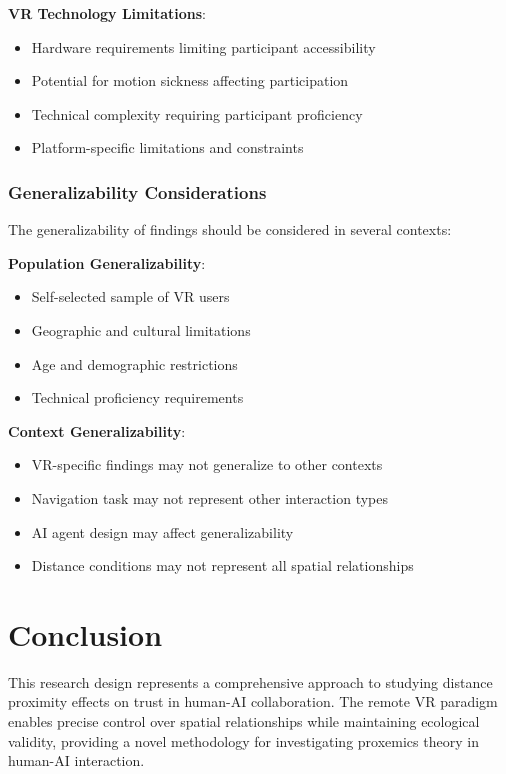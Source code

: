 \documentclass[12pt]{article}
\begin{document}
\textbf{VR Technology Limitations}:
\begin{itemize}
    \item Hardware requirements limiting participant accessibility
    \item Potential for motion sickness affecting participation
    \item Technical complexity requiring participant proficiency
    \item Platform-specific limitations and constraints
\end{itemize}

\subsubsection{Generalizability Considerations}

The generalizability of findings should be considered in several contexts:

\textbf{Population Generalizability}:
\begin{itemize}
    \item Self-selected sample of VR users
    \item Geographic and cultural limitations
    \item Age and demographic restrictions
    \item Technical proficiency requirements
\end{itemize}

\textbf{Context Generalizability}:
\begin{itemize}
    \item VR-specific findings may not generalize to other contexts
    \item Navigation task may not represent other interaction types
    \item AI agent design may affect generalizability
    \item Distance conditions may not represent all spatial relationships
\end{itemize}

\section{Conclusion}

This research design represents a comprehensive approach to studying distance proximity effects on trust in human-AI collaboration. The remote VR paradigm enables precise control over spatial relationships while maintaining ecological validity, providing a novel methodology for investigating proxemics theory in human-AI interaction.
\end{document}

